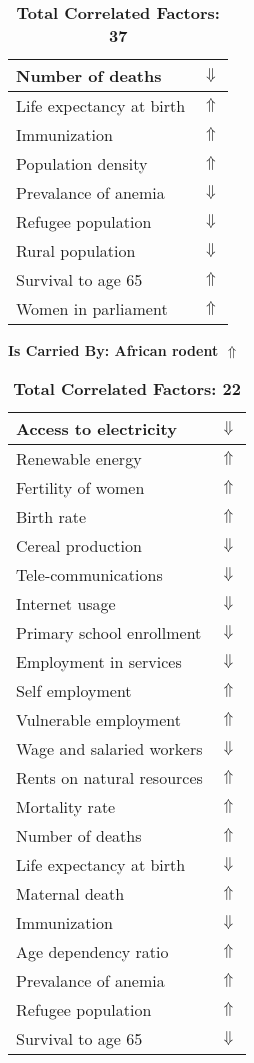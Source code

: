 \documentclass[12pt,notitlepage,oneside]{report}
\begin{document}
\begin{table}[!htb]
\begin{tabular}{|l|l|}
Number of deaths & $\Downarrow$\\ \hline
Life expectancy at birth & $\Uparrow$\\ \hline
Immunization & $\Uparrow$\\ \hline
Population density & $\Uparrow$\\ \hline
Prevalance of anemia & $\Downarrow$\\ \hline
Refugee population & $\Downarrow$\\ \hline
Rural population & $\Downarrow$\\ \hline
Survival to age 65 & $\Uparrow$\\ \hline
Women in parliament & $\Uparrow$\\ \hline
\end{tabular}
\caption*{\textbf{Total Correlated Factors: 37}}
\end{table}
\clearpage
\begin{table}[!htb]
\caption{\textbf{Is Carried By: African rodent $\Uparrow$}}
\centering
\label{Correlated Socio-economic Factors0}
\begin{tabular}{|l|l|}
\hline
Access to electricity & $\Downarrow$\\ \hline
Renewable energy & $\Uparrow$\\ \hline
Fertility of women & $\Uparrow$\\ \hline
Birth rate & $\Uparrow$\\ \hline
Cereal production & $\Downarrow$\\ \hline
Tele-communications & $\Downarrow$\\ \hline
Internet usage & $\Downarrow$\\ \hline
Primary school enrollment & $\Downarrow$\\ \hline
Employment in services & $\Downarrow$\\ \hline
Self employment & $\Uparrow$\\ \hline
Vulnerable employment & $\Uparrow$\\ \hline
Wage and salaried workers & $\Downarrow$\\ \hline
Rents on natural resources & $\Uparrow$\\ \hline
Mortality rate & $\Uparrow$\\ \hline
Number of deaths & $\Uparrow$\\ \hline
Life expectancy at birth & $\Downarrow$\\ \hline
Maternal death & $\Uparrow$\\ \hline
Immunization & $\Downarrow$\\ \hline
Age dependency ratio & $\Uparrow$\\ \hline
Prevalance of anemia & $\Uparrow$\\ \hline
Refugee population & $\Uparrow$\\ \hline
Survival to age 65 & $\Downarrow$\\ \hline
\end{tabular}
\caption*{\textbf{Total Correlated Factors: 22}}
\end{table}
\end{document}
